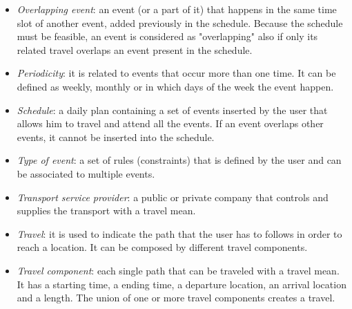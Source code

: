 \begin{itemize}
	\item \textit{Overlapping event}: an event (or a part of it) that happens in the same time slot of another event, added previously in the schedule. Because the schedule must be feasible, an event is considered as "overlapping" also if only its related travel overlaps an event present in the schedule.
	\item \textit{Periodicity}: it is related to events that occur more than one time. It can be defined as weekly, monthly or in which days of the week the event happen.
	\item \textit{Schedule}: a daily plan containing a set of events inserted by the user that allows him to travel and attend all the events. If an event overlaps other events, it cannot be inserted into the schedule. 
	\item \textit{Type of event}: a set of rules (constraints) that is defined by the user and can be associated to multiple events.
	\item \textit{Transport service provider}: a public or private company that controls and supplies the transport with a travel mean. 
	\item \textit{Travel}: it is used to indicate the path that the user has to follows in order to reach a location. It can be composed by different travel components.
	\item \textit{Travel component}: each single path that can be traveled with a travel mean. It has a starting time, a ending time, a departure location, an arrival location and a length. The union of one or more travel components creates a travel.
	\end{itemize}